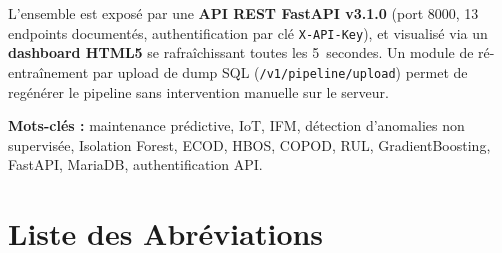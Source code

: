 \documentclass[12pt,a4paper]{report}
\begin{document}
L'ensemble est exposé par une \textbf{API REST FastAPI v3.1.0} (port 8000, 13 endpoints
documentés, authentification par clé \texttt{X-API-Key}), et visualisé via un
\textbf{dashboard HTML5} se rafraîchissant toutes les 5~secondes. Un module de
ré-entraînement par upload de dump SQL (\texttt{/v1/pipeline/upload}) permet de
regénérer le pipeline sans intervention manuelle sur le serveur.

\textbf{Mots-clés :} maintenance prédictive, IoT, IFM, détection d'anomalies non supervisée,
Isolation Forest, ECOD, HBOS, COPOD, RUL, GradientBoosting, FastAPI, MariaDB, authentification API.

\tableofcontents
\listoffigures
\listoftables

\chapter*{Liste des Abréviations}
\end{document}
